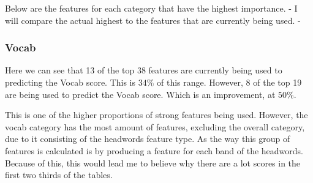 Below are the features for each category that have the highest importance.
- I will compare the actual highest to the features that are currently being used.
- 

\subsubsection{Vocab}

Here we can see that 13 of the top 38 features are currently being used to predicting the Vocab score. This is $34\%$ of this range. However, 8 of the top 19 are being used to predict the Vocab score. Which is an improvement, at $50\%$. 

This is one of the higher proportions of strong features being used. However, the  vocab category has the most amount of features, excluding the overall category, due to it consisting of the headwords feature type. As the way this group of features is calculated is by producing a feature for each band of the headwords. Because of this, this would lead me to believe why there are a lot scores in the first two thirds of the tables.

